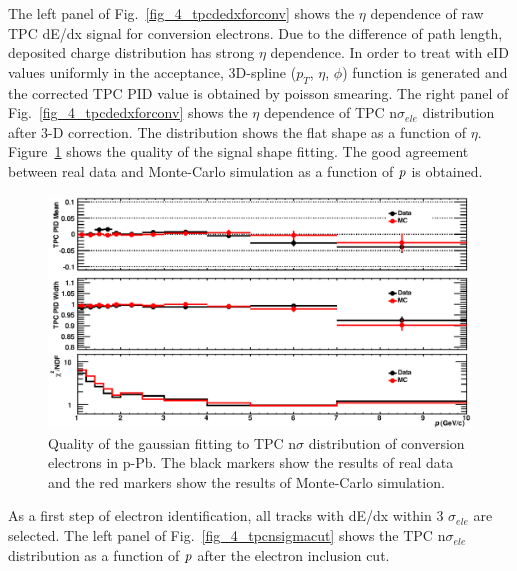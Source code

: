 The left panel of Fig.~\ref{fig_4_tpcdedxforconv} shows the $\eta$ dependence of raw TPC dE/dx signal for conversion electrons. 
Due to the difference of path length, deposited charge distribution has strong $\eta$ dependence. 
In order to treat with eID values uniformly in the acceptance, 3D-spline ($p_{T}$, $\eta$, $\phi$) function is generated and the corrected TPC PID value is obtained by poisson smearing. 
The right panel of Fig.~\ref{fig_4_tpcdedxforconv} shows the $\eta$ dependence of TPC n$\sigma_{ele}$ distribution after 3-D correction.  
The distribution shows the flat shape as a function of $\eta$.  
Figure~\ref{fig_4_tpc_pidfit} shows the quality of the signal shape fitting. 
The good agreement between real data and Monte-Carlo simulation as a function of $\it{p}$ is obtained. 
\begin{figure}[!h]
  \centering
  \includegraphics[width=15cm]{chap4/figure/PID/ConvFit_AddEtaCorr_MB.eps}
  \caption{Quality of the gaussian fitting to TPC n$\sigma$ distribution of conversion electrons in p-Pb. The black markers show the results of real data and the red markers show the results of Monte-Carlo simulation.}
  \label{fig_4_tpc_pidfit}
\end{figure}

As a first step of electron identification, all tracks with dE/dx within 3 $\sigma_{ele}$ are selected. 
The left panel of Fig.~\ref{fig_4_tpcnsigmacut} shows the TPC n$\sigma_{ele}$ distribution as a function of $\it{p}$ after the electron inclusion cut. 

